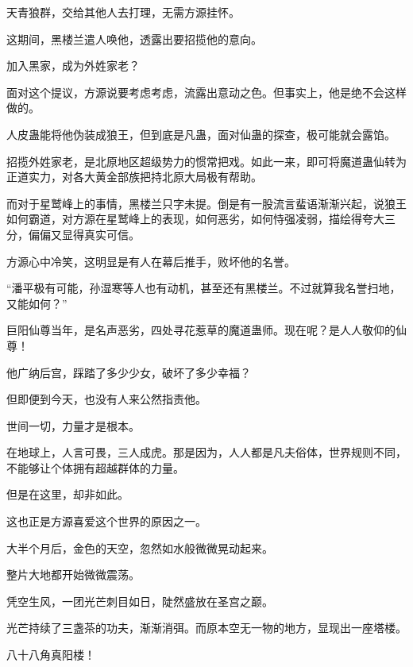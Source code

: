 \begin{this_body}
天青狼群，交给其他人去打理，无需方源挂怀。

这期间，黑楼兰遣人唤他，透露出要招揽他的意向。

加入黑家，成为外姓家老？

面对这个提议，方源说要考虑考虑，流露出意动之色。但事实上，他是绝不会这样做的。

人皮蛊能将他伪装成狼王，但到底是凡蛊，面对仙蛊的探查，极可能就会露馅。

招揽外姓家老，是北原地区超级势力的惯常把戏。如此一来，即可将魔道蛊仙转为正道实力，对各大黄金部族把持北原大局极有帮助。

而对于星鹫峰上的事情，黑楼兰只字未提。倒是有一股流言蜚语渐渐兴起，说狼王如何霸道，对方源在星鹫峰上的表现，如何恶劣，如何恃强凌弱，描绘得夸大三分，偏偏又显得真实可信。

方源心中冷笑，这明显是有人在幕后推手，败坏他的名誉。

“潘平极有可能，孙湿寒等人也有动机，甚至还有黑楼兰。不过就算我名誉扫地，又能如何？”

巨阳仙尊当年，是名声恶劣，四处寻花惹草的魔道蛊师。现在呢？是人人敬仰的仙尊！

他广纳后宫，踩踏了多少少女，破坏了多少幸福？

但即便到今天，也没有人来公然指责他。

世间一切，力量才是根本。

在地球上，人言可畏，三人成虎。那是因为，人人都是凡夫俗体，世界规则不同，不能够让个体拥有超越群体的力量。

但是在这里，却非如此。

这也正是方源喜爱这个世界的原因之一。

大半个月后，金色的天空，忽然如水般微微晃动起来。

整片大地都开始微微震荡。

凭空生风，一团光芒刺目如日，陡然盛放在圣宫之巅。

光芒持续了三盏茶的功夫，渐渐消弭。而原本空无一物的地方，显现出一座塔楼。

八十八角真阳楼！

\end{this_body}

